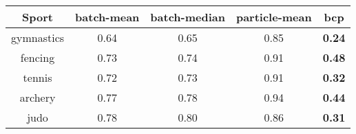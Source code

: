 \begin{tabular}{|c|c|c|c|c|}
\hline
Sport & batch-mean & batch-median & particle-mean & bcp \\
\hline
gymnastics & 0.64 & 0.65 & 0.85 & \textbf{0.24} \\
fencing & 0.73 & 0.74 & 0.91 & \textbf{0.48} \\
tennis & 0.72 & 0.73 & 0.91 & \textbf{0.32} \\
archery & 0.77 & 0.78 & 0.94 & \textbf{0.44} \\
judo & 0.78 & 0.80 & 0.86 & \textbf{0.31} \\
\hline
\end{tabular}
